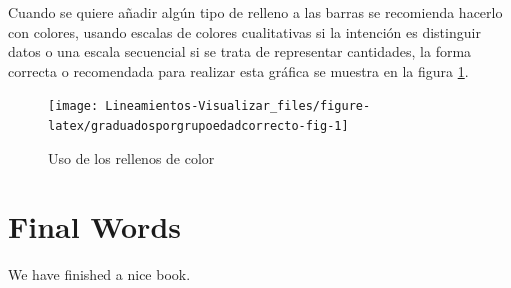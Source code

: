 \documentclass[
]{book}
\begin{document}
Cuando se quiere añadir algún tipo de relleno a las barras se recomienda hacerlo con colores, usando escalas de colores cualitativas si la intención es distinguir datos o una escala secuencial si se trata de representar cantidades, la forma correcta o recomendada para realizar esta gráfica se muestra en la figura \ref{fig:graduadosporgrupoedadcorrecto-fig}.

\begin{figure}

{\centering \texttt{[image: Lineamientos-Visualizar\_files/figure-latex/graduadosporgrupoedadcorrecto-fig-1]} 

}

\caption{Uso de los rellenos de color}\label{fig:graduadosporgrupoedadcorrecto-fig}
\end{figure}

\hypertarget{final-words}{%
\chapter{Final Words}\label{final-words}}

We have finished a nice book.

  
\end{document}

